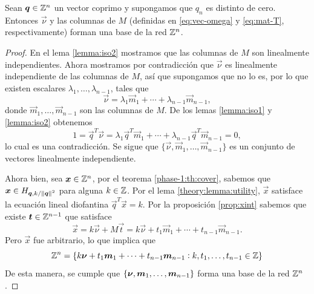 \begin{theorem}
	\label{th:lattice}
	Sean $\boldsymbol{q} \in \mathbb{Z}^n$ un vector coprimo y supongamos que $q_n$ es distinto de cero. Entonces
	$\vec{\nu}$ y las columnas de $M$ (definidas en \eqref{eq:vec-omega} y \eqref{eq:mat-T},
	respectivamente) forman una base de la red $\mathbb{Z}^n$.
\end{theorem}
\begin{proof}
	En el lema \ref{lemma:iso2} mostramos que las columnas de $M$ son linealmente independientes.
	Ahora mostramos por contradicción que $\vec{\nu}$ es linealmente independiente de las columnas de
	$M$, así que supongamos que no lo es, por lo que existen escalares $\lambda_1, \ldots,
	\lambda_{n-1}$, tales que
	\begin{equation*}
		\vec{\nu} = \lambda_1 \vec{m}_1 + \cdots + \lambda_{n-1} \vec{m}_{n-1},
	\end{equation*}
	donde $\vec{m}_1, \ldots, \vec{m}_{n-1}$ son las columnas de $M$. De los lemas \ref{lemma:iso1}
	y \ref{lemma:iso2} obtenemos
	\begin{equation*}
		1 = \vec{q}^T\vec{\nu} = \lambda_1 \vec{q}^T\vec{m}_1 + \cdots + \lambda_{n-1}
		\vec{q}^T\vec{m}_{n-1} = 0,
	\end{equation*}
	lo cual es una contradicción. Se sigue que $\lbrace \vec{\nu}, \vec{m}_1, \ldots,
	\vec{m}_{n-1}\rbrace$ es un conjunto de vectores linealmente independiente.

	Ahora bien, sea $\boldsymbol{x} \in \mathbb{Z}^n$, por el teorema \ref{phase-1:th:cover}, sabemos que $\boldsymbol{x}
	\in H_{\boldsymbol{q}, k/\left\lVert \boldsymbol{q} \right\rVert^{2}}$ para alguna $k \in \mathbb{Z}$. Por el lema \ref{theory:lemma:utility}, $\vec{x}$
	satisface la ecuación lineal diofantina $\vec{q}^T\vec{x} = k$. Por la proposición
	\ref{prop:xint} sabemos que existe $\boldsymbol{t} \in \mathbb{Z}^{n-1}$ que satisface
	\begin{equation*}
		\vec{x} = k\vec{\nu} + M\vec{t} = k\vec{\nu} + t_1\vec{m}_1 + \cdots +
		t_{n-1}\vec{m}_{n-1}.
	\end{equation*}
	Pero $\vec{x}$ fue arbitrario, lo que implica que
	\begin{equation*}
		\mathbb{Z}^n = \lbrace 
			k\boldsymbol{\nu} + t_1\boldsymbol{m}_1 + \cdots + t_{n-1}\boldsymbol{m}_{n-1}
		\vcentcolon k, t_1, \ldots, t_{n-1} \in \mathbb{Z} \rbrace
	\end{equation*}
	De esta manera, se cumple que $\lbrace \boldsymbol{\nu}, \boldsymbol{m}_1, \ldots, \boldsymbol{m}_{n-1} \rbrace$ forma
	una base de la red $\mathbb{Z}^n$.
\end{proof}

